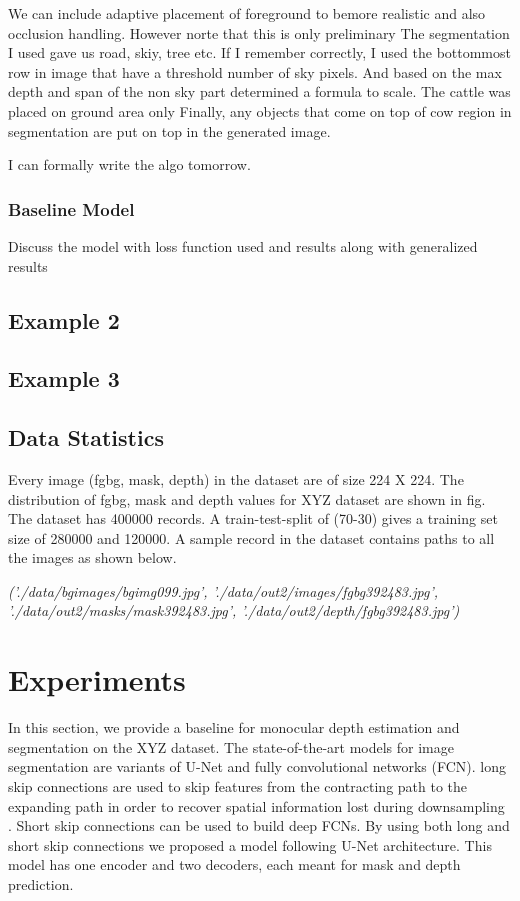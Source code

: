 \documentclass{article}
\begin{document}
We can include adaptive placement of foreground to bemore realistic and also occlusion handling. However norte that this is only preliminary
The segmentation I used gave us road, skiy, tree etc. If I remember correctly, I used the bottommost row in image that have a threshold number of
sky pixels. And based on the max depth and span of the non sky part determined a formula to scale. The cattle was placed on ground area only
Finally, any objects that come on top of cow region in segmentation are put on top in the generated image.

I can formally write the algo tomorrow.

\subsubsection{Baseline Model}
Discuss the model with loss function used and results along with generalized results

\subsection{Example 2} %

\subsection{Example 3} %




\subsection{Data Statistics}
Every image (fgbg, mask, depth) in the dataset are of size 224 X 224. 
The distribution of fgbg, mask and depth values for XYZ dataset are shown in fig. 
The dataset has 400000 records. A train-test-split of (70-30) gives a training set size of 280000 and 120000. 
A sample record in the dataset contains paths to all the images as shown below.

\textit{('./data/bgimages/bgimg099.jpg', 
'./data/out2/images/fgbg392483.jpg', 
'./data/out2/masks/mask392483.jpg', 
'./data/out2/depth/fgbg392483.jpg')}

\section{Experiments}
In this section, we provide a baseline for monocular depth estimation and segmentation on the XYZ dataset. 
The state-of-the-art models for image segmentation are variants of U-Net and fully convolutional networks (FCN)\cite{drozdzal2016importance}. 
long skip connections are used to skip features from the contracting path to the expanding path in order to recover 
spatial information lost during downsampling \cite{zhou2019unet++}. Short skip connections can be used to build deep FCNs. 
By using both long and short skip connections we proposed a model following U-Net architecture. 
This model has one encoder and two decoders, each meant for mask and depth prediction.
\end{document}
